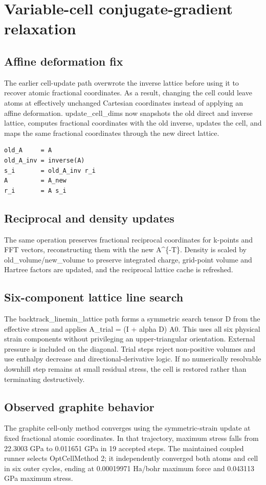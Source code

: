 \documentclass[10pt,a4paper]{report}
\begin{document}
\chapter{Variable-cell conjugate-gradient relaxation}
\section{Affine deformation fix}
The earlier cell-update path overwrote the inverse lattice before using it to recover atomic fractional coordinates. As a result, changing the cell could leave atoms at effectively unchanged Cartesian coordinates instead of applying an affine deformation. update\_cell\_dims now snapshots the old direct and inverse lattice, computes fractional coordinates with the old inverse, updates the cell, and maps the same fractional coordinates through the new direct lattice.

\begin{lstlisting}
old_A     = A
old_A_inv = inverse(A)
s_i       = old_A_inv r_i
A         = A_new
r_i       = A s_i
\end{lstlisting}
\section{Reciprocal and density updates}
The same operation preserves fractional reciprocal coordinates for k-points and FFT vectors, reconstructing them with the new A\textasciicircum{}\{-T\}. Density is scaled by old\_volume/new\_volume to preserve integrated charge, grid-point volume and Hartree factors are updated, and the reciprocal lattice cache is refreshed.

\section{Six-component lattice line search}
The backtrack\_linemin\_lattice path forms a symmetric search tensor D from the effective stress and applies A\_trial = (I + alpha D) A0. This uses all six physical strain components without privileging an upper-triangular orientation. External pressure is included on the diagonal. Trial steps reject non-positive volumes and use enthalpy decrease and directional-derivative logic. If no numerically resolvable downhill step remains at small residual stress, the cell is restored rather than terminating destructively.

\section{Observed graphite behavior}
The graphite cell-only method converges using the symmetric-strain update at fixed fractional atomic coordinates. In that trajectory, maximum stress falls from 22.3003 GPa to 0.011651 GPa in 19 accepted steps. The maintained coupled runner selects OptCellMethod 2; it independently converged both atoms and cell in six outer cycles, ending at 0.00019971 Ha/bohr maximum force and 0.043113 GPa maximum stress.
\end{document}
